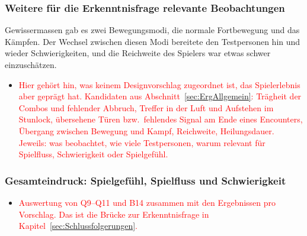 \documentclass[../Main.tex]{subfiles}
\begin{document}
\subsubsection{Weitere für die Erkenntnisfrage relevante Beobachtungen} \label{sec:WeitereBeobachtungen}

Gewissermassen gab es zwei Bewegungsmodi, die normale Fortbewegung und das Kämpfen. Der Wechsel zwischen diesen Modi bereitete den Testpersonen hin und wieder Schwierigkeiten, und die Reichweite des Spielers war etwas schwer einzuschätzen.

\begin{itemize}[leftmargin=1.5cm]
    \item \textcolor{red}{Hier gehört hin, was keinem Designvorschlag zugeordnet ist, das Spielerlebnis aber geprägt hat. Kandidaten aus Abschnitt~\ref{sec:ErgAllgemein}: Trägheit der Combos und fehlender Abbruch, Treffer in der Luft und Aufstehen im Stunlock, übersehene Türen bzw.\ fehlendes Signal am Ende eines Encounters, Übergang zwischen Bewegung und Kampf, Reichweite, Heilungsdauer. Jeweils: was beobachtet, wie viele Testpersonen, warum relevant für Spielfluss, Schwierigkeit oder Spielgefühl.}
\end{itemize}

\subsubsection{Gesamteindruck: Spielgefühl, Spielfluss und Schwierigkeit} \label{sec:Gesamteindruck}

\begin{itemize}[leftmargin=1.5cm]
    \item \textcolor{red}{Auswertung von Q9--Q11 und B14 zusammen mit den Ergebnissen pro Vorschlag. Das ist die Brücke zur Erkenntnisfrage in Kapitel~\ref{sec:Schlussfolgerungen}.}
\end{itemize}
\end{document}
